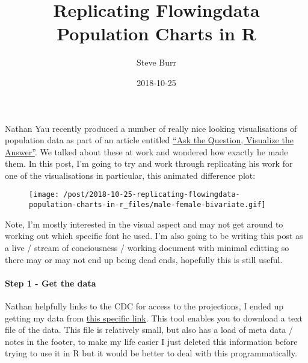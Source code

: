 \documentclass[]{article}
\title{Replicating Flowingdata Population Charts in R}
\author{Steve Burr}
\date{2018-10-25}
\newenvironment{Shaded}{\begin{snugshade}}{\end{snugshade}}
\newcommand{\KeywordTok}[1]{\textcolor[rgb]{0.13,0.29,0.53}{\textbf{#1}}}
\newcommand{\DataTypeTok}[1]{\textcolor[rgb]{0.13,0.29,0.53}{#1}}
\newcommand{\DecValTok}[1]{\textcolor[rgb]{0.00,0.00,0.81}{#1}}
\newcommand{\StringTok}[1]{\textcolor[rgb]{0.31,0.60,0.02}{#1}}
\newcommand{\CommentTok}[1]{\textcolor[rgb]{0.56,0.35,0.01}{\textit{#1}}}
\newcommand{\OperatorTok}[1]{\textcolor[rgb]{0.81,0.36,0.00}{\textbf{#1}}}
\newcommand{\NormalTok}[1]{#1}
\let\oldparagraph\paragraph
\renewcommand{\paragraph}[1]{\oldparagraph{#1}\mbox{}}
\begin{document}
\maketitle

\begin{Shaded}
\end{Shaded}

Nathan Yau recently produced a number of really nice looking
visualisations of population data as part of an article entitled
\href{https://flowingdata.com/2018/10/17/ask-the-question-visualize-the-answer/}{``Ask
the Question, Visualize the Answer''}. We talked about these at work and
wondered how exactly he made them. In this post, I'm going to try and
work through replicating his work for one of the visualisations in
particular, this animated difference plot:

\begin{figure}
\centering
\texttt{[image: /post/2018-10-25-replicating-flowingdata-population-charts-in-r\_files/male-female-bivariate.gif]}
\caption{}
\end{figure}

Note, I'm mostly interested in the visual aspect and may not get around
to working out which specific font he used. I'm also going to be writing
this post as a live / stream of conciousness / working document with
minimal editting so there may or may not end up being dead ends,
hopefully this is still useful.

\paragraph{Step 1 - Get the data}\label{step-1---get-the-data}

Nathan helpfully links to the CDC for access to the projections, I ended
up getting my data from
\href{https://wonder.cdc.gov/population-projections-2014-2060.html}{this
specific link}. This tool enables you to download a text file of the
data. This file is relatively small, but also has a load of meta data /
notes in the footer, to make my life easier I just deleted this
information before trying to use it in R but it would be better to deal
with this programmatically.
\end{document}
